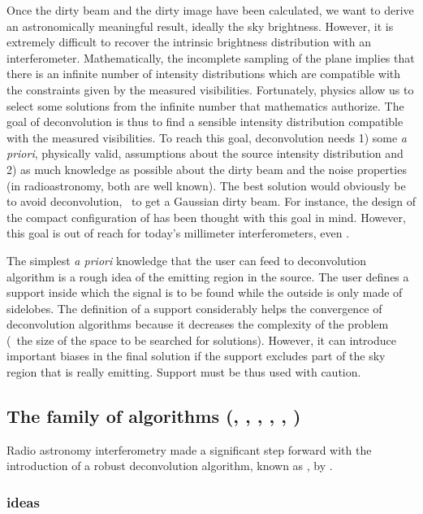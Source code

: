 Once the dirty beam and the dirty image have been calculated, we want to
derive an astronomically meaningful result, ideally the sky brightness.
However, it is extremely difficult to recover the intrinsic brightness
distribution with an interferometer. Mathematically, the
incomplete sampling of the \uv{} plane implies that there is an infinite
number of intensity distributions which are compatible with the constraints
given by the measured visibilities.  Fortunately, physics allow us to
select some solutions from the infinite number that mathematics authorize.
The goal of deconvolution is thus to find a sensible intensity distribution
compatible with the measured visibilities. To reach this goal,
deconvolution needs 1) some \emph{a priori}, physically valid, assumptions
about the source intensity distribution and 2) as much knowledge as
possible about the dirty beam and the noise properties (in radioastronomy,
both are well known). The best solution would obviously be to avoid
deconvolution, \ie\ to get a Gaussian dirty beam. For instance, the design
of the compact configuration of \ALMA{} has been thought with this goal in
mind. However, this goal is out of reach for today's millimeter
interferometers, even \ALMA{}.

The simplest \emph{a priori} knowledge that the user can feed to
deconvolution algorithm is a rough idea of the emitting region in the
source.  The user defines a support inside which the signal is to be found
while the outside is only made of sidelobes. The definition of a support
considerably helps the convergence of deconvolution algorithms because it
decreases the complexity of the problem (\ie\ the size of the space to be
searched for solutions). However, it can introduce important biases in the
final solution if the support excludes part of the sky region that is really
emitting. Support must be thus used with caution.

\subsection{The family of \clean{} algorithms (, ,
  , , , )}

Radio astronomy interferometry made a significant step forward with the
introduction of a robust deconvolution algorithm, known as \clean{}, by
\cite{hogbom74}.

\subsubsection{\clean{} ideas}

